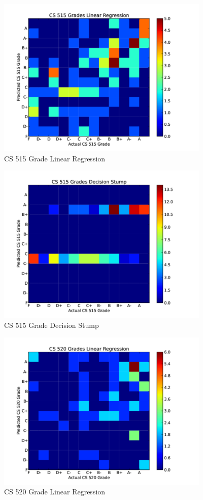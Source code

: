 \documentclass[letterpaper,11pt]{article}
\begin{document}
\begin{figure}[h!]
\includegraphics[width=4in]{515grade_lin.pdf}
  \caption {CS 515 Grade Linear Regression}
\label{figure:heatmaps3}
\end{figure}

\begin{figure}[h!]
\includegraphics[width=4in]{515grade_des.pdf}
  \caption {CS 515 Grade Decision Stump}
\label{figure:heatmaps4}
\end{figure}

\begin{figure}[h!]
\includegraphics[width=4in]{520grade_lin.pdf}
  \caption {CS 520 Grade Linear Regression}
\label{figure:heatmaps5}
\end{figure}
\end{document}
